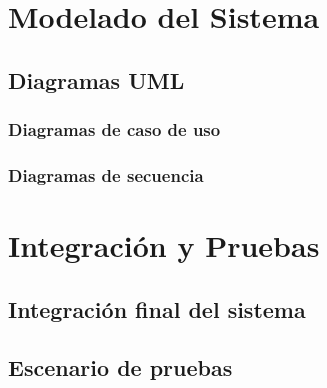 \section{Modelado del Sistema}
\subsection{Diagramas UML}
\subsubsection{Diagramas de caso de uso}
\subsubsection{Diagramas de secuencia}

\section{Integración y Pruebas}
\subsection{Integración final del sistema}
\subsection{Escenario de pruebas}
